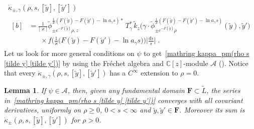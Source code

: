 \documentclass{memo-l}
\theoremstyle{plain}
\newtheorem{lem}[thm]{Lemma}
\theoremstyle{definition}
\theoremstyle{remark}
\newcommand{\C}{\mathbb{C}}
\renewcommand{\AA}{\mathcal{A}}
\newcommand{\bfF}{\boldsymbol{F}}
\numberwithin{section}{chapter}
\numberwithin{equation}{section}%
\begin{document}
\begin{multline}\label{mathring kappa_pm gamma(rho s [tilde y] [tilde y'])}
\mathring\kappa_{\pm,\gamma}(\rho,s,[\tilde y],[\tilde y'])\\
\begin{aligned}[b]
&=\frac{1}{|\varkappa|}\tilde\phi_{\pm e^{-F(\tilde y)}\rho,z}^{\frac{1}{\varkappa}
(F(\tilde y)-F(\tilde y')-\ln a_\gamma s)*}\,T_\gamma^*\,
\tilde k_z\Big(\gamma\cdot \tilde\phi^{\frac{1}{\varkappa}(F(\tilde y)-F(\tilde y')
-\ln a_\gamma s)}_{\pm e^{-F(\tilde y)}\rho}(\tilde y),\tilde y'\Big)\\
&\phantom{:=\text{}}\text{}\times f\Big(\frac{1}{\varkappa}\big(F(\tilde y)-F(\tilde y')-\ln a_\gamma s\big)\Big)
\Big|\frac{ds}{s}\Big|\;.
\end{aligned}
\end{multline}
Let us look for more general conditions on $\psi$ to get~\eqref{mathring kappa_pm(rho s [tilde y] [tilde y'])} by using the Fr\'echet algebra and $\C[z]$-module $\AA$ (). Notice that every $\mathring\kappa_{\pm,\gamma}(\rho,s,[\tilde y],[\tilde y'])$ has a $C^\infty$ extension to $\rho=0$.

\begin{lem}\label{l: kappa_mathring P_pm}
If $\psi\in \AA$, then, given any fundamental domain $\bfF\subset\widetilde L$, the series in~\eqref{mathring kappa_pm(rho s [tilde y] [tilde y'])} converges with all covariant derivatives, uniformly on $\rho\ge0$, $0<s<\infty$ and $\tilde y,\tilde y'\in \bfF$. Moreover its sum is $\mathring\kappa_\pm(\rho,s,[\tilde y],[\tilde y'])$ for $\rho>0$.
\end{lem}
\end{document}
